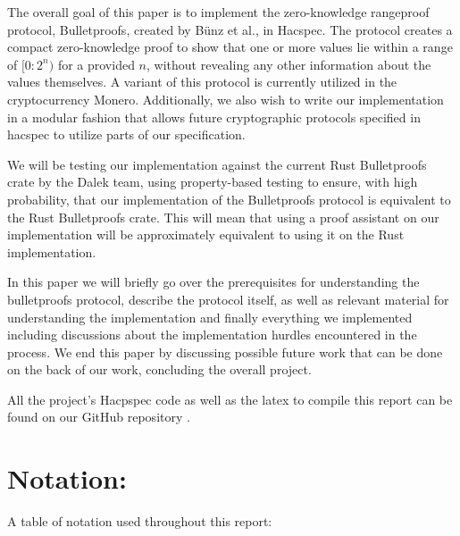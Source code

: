 \documentclass{article}
\begin{document}
The overall goal of this paper is to implement the zero-knowledge
rangeproof protocol, Bulletproofs, created by Bünz et
al.\cite{bulletproofs}, in Hacspec. The protocol creates a compact
zero-knowledge proof to show that one or more values lie within a
range of $[0:2^n)$ for a provided $n$, without revealing any other
information about the values themselves. A variant of this protocol
is currently utilized in the cryptocurrency Monero. Additionally,
we also wish to write our implementation in a modular fashion that
allows future cryptographic protocols specified in hacspec to utilize
parts of our specification.

We will be testing our implementation against the current Rust
Bulletproofs crate \cite{dalek} by the Dalek team, using property-based
testing to ensure, with high probability, that our implementation of the
Bulletproofs protocol is equivalent to the Rust Bulletproofs crate. This
will mean that using a proof assistant on our implementation will be
approximately equivalent to using it on the Rust implementation.

In this paper we will briefly go over the prerequisites for
understanding the bulletproofs protocol, describe the protocol itself,
as well as relevant material for understanding the implementation
and finally everything we implemented including discussions about the
implementation hurdles encountered in the process. We end this paper
by discussing possible future work that can be done on the back of
our work, concluding the overall project.

All the project's Hacpspec code as well as the latex to
compile this report can be found on our GitHub repository
\cite{hacspec-bulletproofs}.


\newpage

\section{Notation:} \label{notation}

A table of notation used throughout this report:
\end{document}
